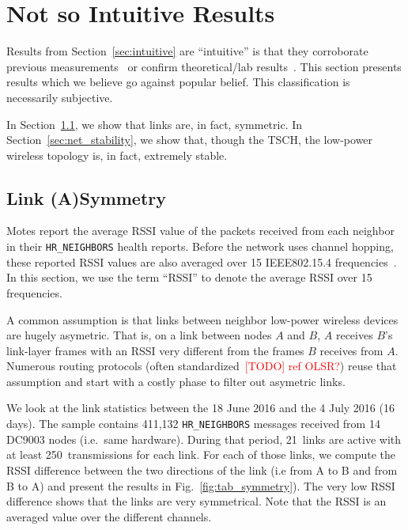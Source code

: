 \documentclass{sig-alternate}
\newcommand{\todo}[1]        {\textcolor{red}{[TODO] #1}}
\newcommand{\HRNEIGHBORS}         {{\tt HR\_NEIGHBORS}\xspace}
\begin{document}
\section{Not so Intuitive Results}
\label{sec:notsointuitive}

Results from Section~\ref{sec:intuitive} are ``intuitive'' is that they corroborate previous measurements~\cite{watteyne16peach} or confirm theoretical/lab results~\cite{watteyne10mitigating,watteyne09reliability,watteyne15industrial}.
This section presents results which we believe go against popular belief.
This classification is necessarily subjective.

In Section~\ref{sec:symmetry}, we show that links are, in fact, symmetric.
In Section~\ref{sec:net_stability}, we show that, though the TSCH, the low-power wireless topology is, in fact, extremely stable.

\subsection{Link (A)Symmetry}
\label{sec:symmetry}


Motes report the average RSSI value of the packets received from each neighbor in their \HRNEIGHBORS health reports.
Before the network uses channel hopping, these reported RSSI values are also averaged over 15 IEEE802.15.4 frequencies~\cite{std_ieee802154_2011}.
In this section, we use the term ``RSSI'' to denote the average RSSI over 15 frequencies.


A common assumption is that links between neighbor low-power wireless devices are hugely asymetric.
That is, on a link between nodes $A$ and $B$, $A$ receives $B$'s link-layer frames with an RSSI very different from the frames $B$ receives from $A$.
Numerous routing protocols (often standardized~\todo{ref OLSR?}) reuse that assumption and start with a costly phase to filter out asymetric links.


We look at the link statistics between the 18 June 2016 and the 4 July 2016 (16 days).
The sample contains 411,132 \HRNEIGHBORS messages received from 14 DC9003 nodes (i.e.~same hardware).
During that period, 21~links are active with at least 250~transmissions for each link.
For each of those links, we compute the RSSI difference between the two directions of the link (i.e from A to B and from B to A) and present the results in Fig.~\ref{fig:tab_symmetry}).
The very low RSSI difference shows that the links are very symmetrical.
Note that the RSSI is an averaged value over the different channels.
\end{document}
